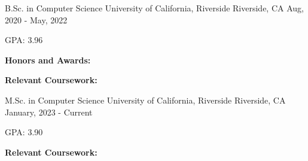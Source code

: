 
\begin{cventries}
  \cventry
    {B.Sc. in Computer Science} %
    {University of California, Riverside} %
    {Riverside, CA} %
    {Aug, 2020 -  May, 2022} %
    {
      \begin{cvitems} %
        \item {GPA: 3.96}
        \item [] \textbf{Honors and Awards:}
        \item [] \textbf{Relevant Coursework:}
      \end{cvitems}
    }
  \cventry
    {M.Sc. in Computer Science} %
    {University of California, Riverside} %
    {Riverside, CA} %
    {January, 2023 - Current} %
    {
      \begin{cvitems} %
        \item {GPA: 3.90}
        \item [] \textbf{Relevant Coursework:}
      \end{cvitems}
    }
\end{cventries}
